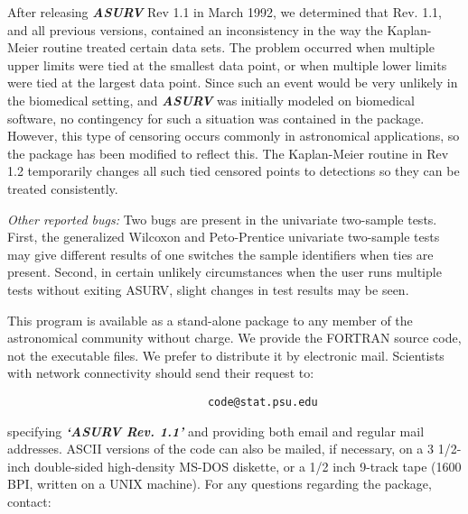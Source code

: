 \bigskip


     After releasing {\sl\bf ASURV} Rev 1.1 in March 1992, we determined that
Rev. 1.1, and all previous versions, contained an inconsistency in the
way the Kaplan-Meier routine treated certain data sets.  The problem occurred 
when multiple upper limits were tied at the smallest data point, or when
multiple lower limits were tied at the largest data point.  Since such an 
event would be very unlikely in the biomedical setting, and {\sl\bf ASURV}
was initially modeled on biomedical software, no contingency for such a
situation was contained in the package.  However, this type of censoring
occurs commonly in astronomical applications, so the package has been 
modified to reflect this.  The Kaplan-Meier routine in Rev 1.2 temporarily 
changes all such tied censored points to detections so they can be 
treated consistently.

{\it Other reported bugs:}  Two bugs are present in the univariate
two-sample tests.  First, the generalized Wilcoxon and Peto-Prentice 
univariate two-sample tests may give different results of one switches 
the sample identifiers when ties are present.  Second, in certain unlikely 
circumstances when the user runs multiple tests without exiting ASURV, slight 
changes in test results may be seen.  

\bigskip

 
     This program is available as a stand-alone package  to any member of 
the astronomical community without charge.  We provide the FORTRAN source code,
not the executable files. We prefer to distribute it by electronic mail.  
Scientists with network connectivity should send their request to:

\begin{center}
\begin{verbatim}
                               code@stat.psu.edu
\end{verbatim}
\end{center}

\noindent specifying {\sl\bf `ASURV Rev. 1.1'} and providing both email and 
regular mail addresses.   ASCII versions of the code can also be mailed, if 
necessary,  on a 3 1/2-inch double-sided high-density MS-DOS diskette, or a
1/2 inch 9-track tape (1600 BPI, written on a UNIX machine).  For any 
questions regarding the package, contact:

